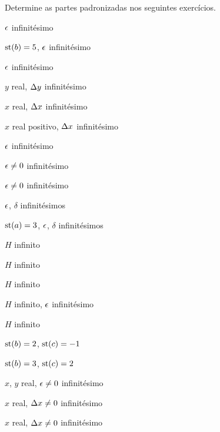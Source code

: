 \begin{sectionproblems}

Determine as partes padronizadas nos seguintes exercícios.

%
     {$\epsilon$ infinitésimo}

%
     {$\operatorname{st}(b) = 5$, \spc $\epsilon$ infinitésimo}

%
     {$\epsilon$ infinitésimo}

%
     {$y$ real, \spc $\Delta{y}$ infinitésimo}

%
     {$x$ real, \spc $\Delta{x}$ infinitésimo}

%
     {$x$ real positivo, \spc $\Delta{x}$ infinitésimo}

%
     {$\epsilon$ infinitésimo}

%
     {$\epsilon \ne 0$ infinitésimo}

%
     {$\epsilon \ne 0$ infinitésimo}

%
     {$\epsilon$, $\delta$ infinitésimos}

%
     {$\operatorname{st}(a) = 3$, \spc $\epsilon$, $\delta$ infinitésimos}

%
     {$H$ infinito}

%
     {$H$ infinito}

%
     {$H$ infinito}

%
     {$H$ infinito, \spc $\epsilon$ infinitésimo}

%
     {$H$ infinito}

%
     {$\operatorname{st}(b) = 2$, \spc $\operatorname{st}(c) = -1$}

%
     {$\operatorname{st}(b) = 3$, \spc $\operatorname{st}(c) = 2$}

%
     {$x$, $y$ real, \spc $\epsilon \ne 0$ infinitésimo}

%
     {$x$ real, \spc $\Delta{x} \ne 0$ infinitésimo}

%
     {$x$ real, \spc $\Delta{x} \ne 0$ infinitésimo}


\end{sectionproblems}
